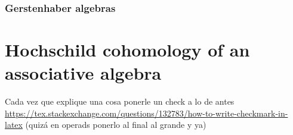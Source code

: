 \documentclass{beamer}
\theoremstyle{definition}
\newcommand{\CC}{\mathcal{C}}
\begin{document}
\begin{frame}
	\frametitle{Gerstenhaber algebras}
\end{frame}


\section{Hochschild cohomology of an associative algebra}

%	
%


\begin{frame}
	Cada vez que explique una cosa ponerle un check a lo de antes \url{https://tex.stackexchange.com/questions/132783/how-to-write-checkmark-in-latex} (quizá en operads ponerlo al final al grande y ya)
\end{frame}
\end{document}
